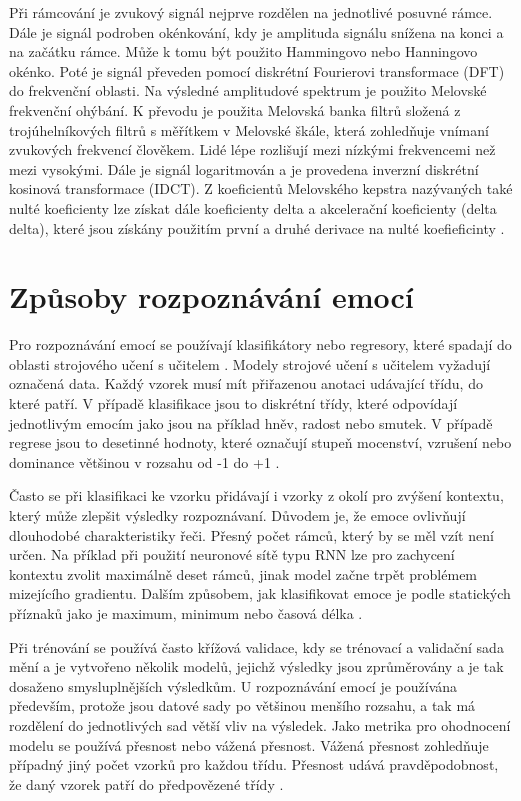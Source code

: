 \documentclass[FM,BP]{tulthesis}
\begin{document}
Při rámcování je zvukový signál nejprve rozdělen na jednotlivé posuvné rámce. Dále je signál podroben okénkování, kdy je amplituda signálu snížena na konci a na začátku rámce. Může k tomu být použito Hammingovo nebo Hanningovo okénko. Poté je signál převeden pomocí diskrétní Fourierovi transformace (DFT) do frekvenční oblasti. Na výsledné amplitudové spektrum je použito Melovské frekvenční ohýbání. K převodu je použita Melovská banka filtrů složená z trojúhelníkových filtrů s měřítkem v Melovské škále, která zohledňuje vnímaní zvukových frekvencí člověkem. Lidé lépe rozlišují mezi nízkými frekvencemi než mezi vysokými. Dále je signál logaritmován a je provedena inverzní diskrétní kosinová transformace (IDCT). Z koeficientů Melovského kepstra nazývaných také nulté koeficienty lze získat dále koeficienty delta a akcelerační koeficienty (delta delta), které jsou získány použitím první a druhé derivace na nulté koefieficinty \cite{mfcc}.

\section{Způsoby rozpoznávání emocí}  %
Pro rozpoznávání emocí se používají klasifikátory nebo regresory, které spadají do oblasti strojového učení s učitelem \cite{DBLP:journals/speech/AkcayO20}. Modely strojové učení s učitelem vyžadují označená data. Každý vzorek musí mít přiřazenou anotaci udávající třídu, do které patří. V případě klasifikace jsou to diskrétní třídy, které odpovídají jednotlivým emocím jako jsou na příklad hněv, radost nebo smutek. V případě regrese jsou to desetinné hodnoty, které označují stupeň mocenství, vzrušení nebo dominance většinou v rozsahu od -1 do +1 \cite{konar_chakraborty_2015}.

Často se při klasifikaci ke vzorku přidávají i vzorky z okolí pro zvýšení kontextu, který může zlepšit výsledky rozpoznávaní. Důvodem je, že emoce ovlivňují dlouhodobé charakteristiky řeči. Přesný počet rámců, který by se měl vzít není určen. Na příklad při použití neuronové sítě typu RNN lze pro zachycení kontextu zvolit maximálně deset rámců, jinak model začne trpět problémem mizejícího gradientu. Dalším způsobem, jak klasifikovat emoce je podle statických příznaků jako je maximum, minimum nebo časová délka \cite{konar_chakraborty_2015}.

Při trénování se používá často křížová validace, kdy se trénovací a validační sada mění a je vytvořeno několik modelů, jejichž výsledky jsou zprůměrovány a je tak dosaženo smysluplnějších výsledkům. U rozpoznávání emocí je používána především, protože jsou datové sady po většinou menšího rozsahu, a tak má rozdělení do jednotlivých sad větší vliv na výsledek. Jako metrika pro ohodnocení modelu se používá přesnost nebo vážená přesnost. Vážená přesnost zohledňuje případný jiný počet vzorků pro každou třídu. Přesnost udává pravděpodobnost, že daný vzorek patří do předpovězené třídy \cite{konar_chakraborty_2015}.
\end{document}
